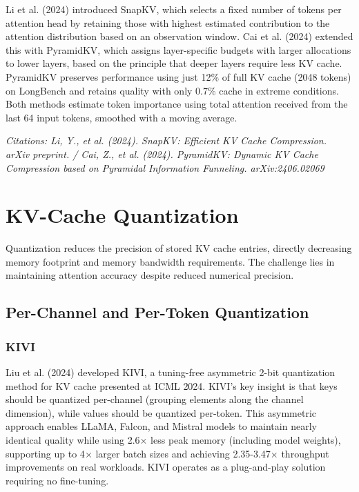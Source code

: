 \documentclass[11pt,letterpaper]{article}
\begin{document}
Li et al. (2024) introduced SnapKV, which selects a fixed number of tokens per attention head by retaining those with highest estimated contribution to the attention distribution based on an observation window. Cai et al. (2024) extended this with PyramidKV, which assigns layer-specific budgets with larger allocations to lower layers, based on the principle that deeper layers require less KV cache. PyramidKV preserves performance using just 12\% of full KV cache (2048 tokens) on LongBench and retains quality with only 0.7\% cache in extreme conditions. Both methods estimate token importance using total attention received from the last 64 input tokens, smoothed with a moving average.

\textit{Citations: Li, Y., et al. (2024). SnapKV: Efficient KV Cache Compression. arXiv preprint. / Cai, Z., et al. (2024). PyramidKV: Dynamic KV Cache Compression based on Pyramidal Information Funneling. arXiv:2406.02069}

\section{KV-Cache Quantization}

Quantization reduces the precision of stored KV cache entries, directly decreasing memory footprint and memory bandwidth requirements. The challenge lies in maintaining attention accuracy despite reduced numerical precision.

\subsection{Per-Channel and Per-Token Quantization}

\subsubsection{KIVI}

Liu et al. (2024) developed KIVI, a tuning-free asymmetric 2-bit quantization method for KV cache presented at ICML 2024. KIVI's key insight is that keys should be quantized per-channel (grouping elements along the channel dimension), while values should be quantized per-token. This asymmetric approach enables LLaMA, Falcon, and Mistral models to maintain nearly identical quality while using 2.6$\times$ less peak memory (including model weights), supporting up to 4$\times$ larger batch sizes and achieving 2.35-3.47$\times$ throughput improvements on real workloads. KIVI operates as a plug-and-play solution requiring no fine-tuning.
\end{document}
